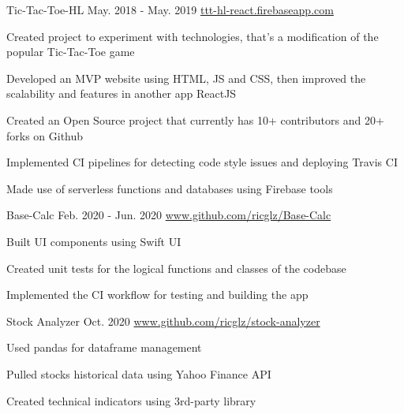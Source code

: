 \begin{cventries}

  \cventry
    {}
    {Tic-Tac-Toe-HL} %
    {May. 2018 - May. 2019} %
    {\url{ttt-hl-react.firebaseapp.com}} %
    {
      \begin{cvitems} %
        \item {Created project to experiment with technologies, that's a modification of the popular Tic-Tac-Toe game}
        \item {Developed an MVP website using HTML, JS and CSS, then improved the scalability and features in another app ReactJS}
        \item {Created an Open Source project that currently has 10+ contributors and 20+ forks on Github}
        \item {Implemented CI pipelines for detecting code style issues and deploying Travis CI}
        \item {Made use of serverless functions and databases using Firebase tools}
      \end{cvitems}
    }

  \cventry
    {}
    {Base-Calc} %
    {Feb. 2020 - Jun. 2020} %
    {\url{www.github.com/ricglz/Base-Calc}} %
    {
      \begin{cvitems} %
        \item {Built UI components using Swift UI}
        \item {Created unit tests for the logical functions and classes of the codebase}
        \item {Implemented the CI workflow for testing and building the app}
      \end{cvitems}
    }

  \cventry
    {}
    {Stock Analyzer} %
    {Oct. 2020} %
    {\url{www.github.com/ricglz/stock-analyzer}} %
    {
      \begin{cvitems} %
        \item {Used pandas for dataframe management}
        \item {Pulled stocks historical data using Yahoo Finance API}
        \item {Created technical indicators using 3rd-party library}
      \end{cvitems}
    }
\end{cventries}
